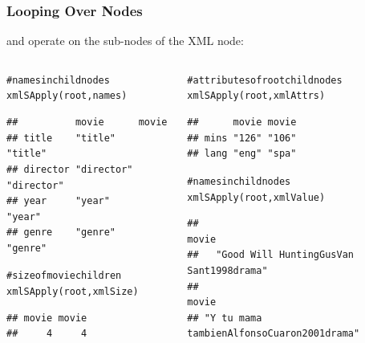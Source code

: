 \documentclass{beamer}\usepackage[]{graphicx}\usepackage[]{color}
\makeatletter
\newcommand{\hlcom}[1]{\textcolor[rgb]{0.588,0.588,0.588}{#1}}%
\newcommand{\hlstd}[1]{\textcolor[rgb]{0.196,0.196,0.196}{#1}}%
\newcommand{\hlkwd}[1]{\textcolor[rgb]{0.78,0.227,0.412}{#1}}%
\newenvironment{kframe}{%
 \def\at@end@of@kframe{}%
 \ifinner\ifhmode%
  \def\at@end@of@kframe{\end{minipage}}%
  \begin{minipage}{\columnwidth}%
 \fi\fi%
 \def\FrameCommand##1{\hskip\@totalleftmargin \hskip-\fboxsep
 \colorbox{shadecolor}{##1}\hskip-\fboxsep
     \hskip-\linewidth \hskip-\@totalleftmargin \hskip\columnwidth}%
 \MakeFramed {\advance\hsize-\width
   \@totalleftmargin\z@ \linewidth\hsize
   \@setminipage}}%
 {\par\unskip\endMakeFramed%
 \at@end@of@kframe}
\newenvironment{knitrout}{}{} %
\makeatother
\begin{document}

\begin{frame}[fragile]
\frametitle{Looping Over Nodes}

 and  operate on the sub-nodes of the XML node:

\begin{columns}[t]
\begin{column}{0.5\textwidth}
\begin{knitrout}\tiny
{}\color{fgcolor}\begin{kframe}
\begin{alltt}
\hlcom{# names in child nodes}
\hlkwd{xmlSApply}\hlstd{(root, names)}
\end{alltt}
\begin{verbatim}
##          movie      movie     
## title    "title"    "title"   
## director "director" "director"
## year     "year"     "year"    
## genre    "genre"    "genre"
\end{verbatim}
\begin{alltt}
\hlcom{# size of movie children}
\hlkwd{xmlSApply}\hlstd{(root, xmlSize)}
\end{alltt}
\begin{verbatim}
## movie movie 
##     4     4
\end{verbatim}
\end{kframe}
\end{knitrout}
\end{column}

\begin{column}{0.5\textwidth}
\begin{knitrout}\tiny
{}\color{fgcolor}\begin{kframe}
\begin{alltt}
\hlcom{# attributes of root child nodes}
\hlkwd{xmlSApply}\hlstd{(root, xmlAttrs)}
\end{alltt}
\begin{verbatim}
##      movie movie
## mins "126" "106"
## lang "eng" "spa"
\end{verbatim}
\begin{alltt}
\hlcom{# names in child nodes}
\hlkwd{xmlSApply}\hlstd{(root, xmlValue)}
\end{alltt}
\begin{verbatim}
##                                     movie 
##   "Good Will HuntingGusVan Sant1998drama" 
##                                     movie 
## "Y tu mama tambienAlfonsoCuaron2001drama"
\end{verbatim}
\end{kframe}
\end{knitrout}
\end{column}
\end{columns}

\end{frame}
\end{document}
